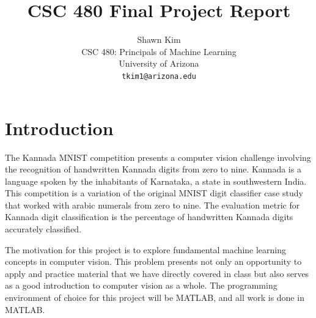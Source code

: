 \documentclass{article}
\title{CSC 480 Final Project Report}
\author{%
  Shawn Kim \\
  CSC 480: Principals of Machine Learning\\
  University of Arizona\\
  \texttt{tkim1@arizona.edu} \\
}
\begin{document}
\maketitle



\section{Introduction}

The Kannada MNIST competition presents a computer vision challenge involving the
recognition of handwritten Kannada digits from zero to nine. Kannada is a
language spoken by the inhabitants of Karnataka, a state in southwestern
India. This competition is a variation of the original MNIST digit classifier
case study that worked with arabic numerals from zero to nine. The evaluation
metric for Kannada digit classification is the percentage of handwritten Kannada
digits accurately classified.

The motivation for this project is to explore fundamental machine learning
concepts in computer vision. This problem presents not only an opportunity to
apply and practice material that we have directly covered in class but also
serves as a good introduction to computer vision as a whole. The programming
environment of choice for this project will be MATLAB, and all work is done in
MATLAB.
\end{document}

